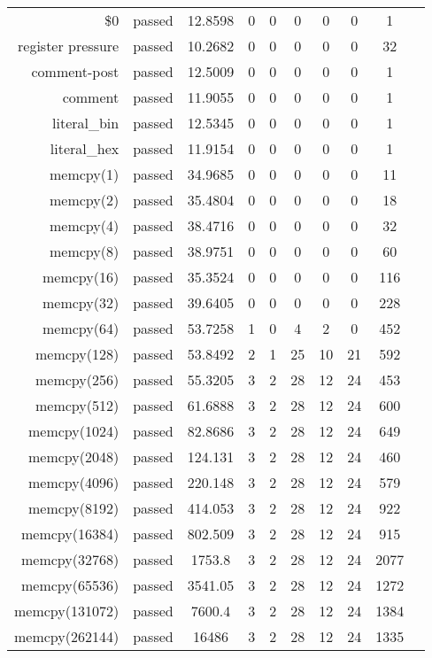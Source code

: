 \begin{longtable}{r|ccccccccc}
    \$0 & passed & 12.8598 & 0 & 0 & 0 & 0 & 0 & 1 \\
    register pressure & passed & 10.2682 & 0 & 0 & 0 & 0 & 0 & 32 \\
    comment-post & passed & 12.5009 & 0 & 0 & 0 & 0 & 0 & 1 \\
    comment & passed & 11.9055 & 0 & 0 & 0 & 0 & 0 & 1 \\
    literal\_bin & passed & 12.5345 & 0 & 0 & 0 & 0 & 0 & 1 \\
    literal\_hex & passed & 11.9154 & 0 & 0 & 0 & 0 & 0 & 1 \\
    memcpy(1) & passed & 34.9685 & 0 & 0 & 0 & 0 & 0 & 11 \\
    memcpy(2) & passed & 35.4804 & 0 & 0 & 0 & 0 & 0 & 18 \\
    memcpy(4) & passed & 38.4716 & 0 & 0 & 0 & 0 & 0 & 32 \\
    memcpy(8) & passed & 38.9751 & 0 & 0 & 0 & 0 & 0 & 60 \\
    memcpy(16) & passed & 35.3524 & 0 & 0 & 0 & 0 & 0 & 116 \\
    memcpy(32) & passed & 39.6405 & 0 & 0 & 0 & 0 & 0 & 228 \\
    memcpy(64) & passed & 53.7258 & 1 & 0 & 4 & 2 & 0 & 452 \\
    memcpy(128) & passed & 53.8492 & 2 & 1 & 25 & 10 & 21 & 592 \\
    memcpy(256) & passed & 55.3205 & 3 & 2 & 28 & 12 & 24 & 453 \\
    memcpy(512) & passed & 61.6888 & 3 & 2 & 28 & 12 & 24 & 600 \\
    memcpy(1024) & passed & 82.8686 & 3 & 2 & 28 & 12 & 24 & 649 \\
    memcpy(2048) & passed & 124.131 & 3 & 2 & 28 & 12 & 24 & 460 \\
    memcpy(4096) & passed & 220.148 & 3 & 2 & 28 & 12 & 24 & 579 \\
    memcpy(8192) & passed & 414.053 & 3 & 2 & 28 & 12 & 24 & 922 \\
    memcpy(16384) & passed & 802.509 & 3 & 2 & 28 & 12 & 24 & 915 \\
    memcpy(32768) & passed & 1753.8 & 3 & 2 & 28 & 12 & 24 & 2077 \\
    memcpy(65536) & passed & 3541.05 & 3 & 2 & 28 & 12 & 24 & 1272 \\
    memcpy(131072) & passed & 7600.4 & 3 & 2 & 28 & 12 & 24 & 1384 \\
    memcpy(262144) & passed & 16486 & 3 & 2 & 28 & 12 & 24 & 1335 \\

\end{longtable}
